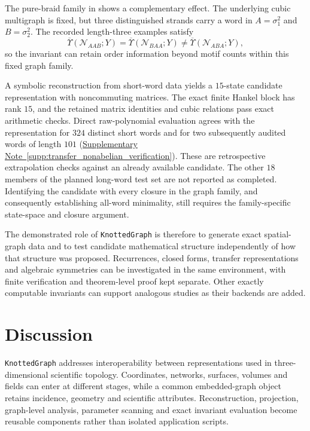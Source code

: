 \documentclass[10pt,twocolumn]{article}
\providecommand{\SuppSubsecref}[1]{\hyperref[#1]{Supplementary Note~\ref*{#1}}}
\begin{document}
The pure-braid family in  shows a complementary effect. The underlying cubic multigraph is fixed, but three distinguished strands carry a word in $A=\sigma_1^2$ and $B=\sigma_2^2$. The recorded length-three examples satisfy
\begin{equation}
\overline{\Upsilon}(\mathcal N_{AAB};Y)
=\overline{\Upsilon}(\mathcal N_{BAA};Y)
\neq\overline{\Upsilon}(\mathcal N_{ABA};Y),
\label{eq:main_nonabelian_example}
\end{equation}
so the invariant can retain order information beyond motif counts within this fixed graph family.

A symbolic reconstruction from short-word data yields a $15$-state candidate representation with noncommuting matrices. The exact finite Hankel block has rank $15$, and the retained matrix identities and cubic relations pass exact arithmetic checks. Direct raw-polynomial evaluation agrees with the representation for $324$ distinct short words and for two subsequently audited words of length $101$ (\SuppSubsecref{supp:transfer_nonabelian_verification}). These are retrospective extrapolation checks against an already available candidate. The other $18$ members of the planned long-word test set are not reported as completed. Identifying the candidate with every closure in the graph family, and consequently establishing all-word minimality, still requires the family-specific state-space and closure argument.

The demonstrated role of \texttt{KnottedGraph} is therefore to generate exact spatial-graph data and to test candidate mathematical structure independently of how that structure was proposed. Recurrences, closed forms, transfer representations and algebraic symmetries can be investigated in the same environment, with finite verification and theorem-level proof kept separate. Other exactly computable invariants can support analogous studies as their backends are added.

\section{Discussion}
\label{sec:discussion}
\texttt{KnottedGraph} addresses interoperability between representations used in three-dimensional scientific topology. Coordinates, networks, surfaces, volumes and fields can enter at different stages, while a common embedded-graph object retains incidence, geometry and scientific attributes. Reconstruction, projection, graph-level analysis, parameter scanning and exact invariant evaluation become reusable components rather than isolated application scripts.
\end{document}
